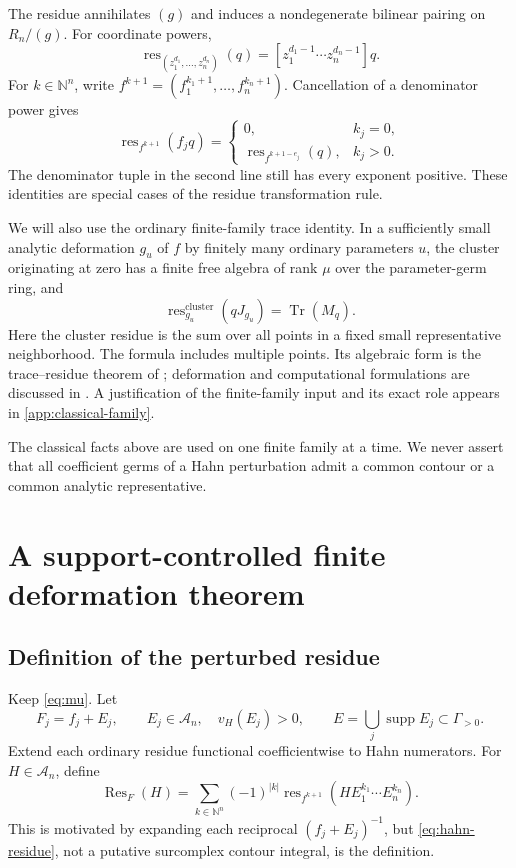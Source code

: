 \documentclass[11pt,letterpaper]{article}
\theoremstyle{definition}
\theoremstyle{remark}
\newcommand{\N}{\mathbb N}
\newcommand{\A}{\mathscr A}
\newcommand{\Res}{\operatorname{Res}}
\newcommand{\res}{\operatorname{res}}
\newcommand{\supp}{\operatorname{supp}}
\newcommand{\Tr}{\operatorname{Tr}}
\newcommand{\vH}{v_{\!H}}
\numberwithin{equation}{section}
\begin{document}
The residue annihilates $(g)$ and induces a nondegenerate bilinear pairing on $R_n/(g)$. For coordinate powers,
\begin{equation}\label{eq:coordinate-residue}
 \res_{(z_1^{d_1},\ldots,z_n^{d_n})}(q)
 =[z_1^{d_1-1}\cdots z_n^{d_n-1}]q.
\end{equation}
For $k\in\N^n$, write $f^{k+1}=(f_1^{k_1+1},\ldots,f_n^{k_n+1})$. Cancellation of a denominator power gives
\begin{equation}\label{eq:pole-cancel}
 \res_{f^{k+1}}(f_jq)=
 \begin{cases}
 0,& k_j=0,\\
 \res_{f^{k+1-e_j}}(q),& k_j>0.
 \end{cases}
\end{equation}
The denominator tuple in the second line still has every exponent positive. These identities are special cases of the residue transformation rule.

We will also use the ordinary finite-family trace identity. In a sufficiently small analytic deformation $g_u$ of $f$ by finitely many ordinary parameters $u$, the cluster originating at zero has a finite free algebra of rank $\mu$ over the parameter-germ ring, and
\begin{equation}\label{eq:ordinary-trace}
 \res_{g_u}^{\mathrm{cluster}}(qJ_{g_u})
 =\Tr(M_q).
\end{equation}
Here the cluster residue is the sum over all points in a fixed small representative neighborhood. The formula includes multiple points. Its algebraic form is the trace--residue theorem of \cite{SS}; deformation and computational formulations are discussed in \cite{KW,CDS}. A justification of the finite-family input and its exact role appears in \cref{app:classical-family}.

The classical facts above are used on one finite family at a time. We never assert that all coefficient germs of a Hahn perturbation admit a common contour or a common analytic representative.

\section{A support-controlled finite deformation theorem}\label{sec:deform}

\subsection{Definition of the perturbed residue}
Keep \eqref{eq:mu}. Let
\begin{equation}\label{eq:perturbed}
 F_j=f_j+E_j,\qquad E_j\in\A_n,\quad \vH(E_j)>0,
 \qquad E=\bigcup_j\supp E_j\subset\Gamma_{>0}.
\end{equation}
Extend each ordinary residue functional coefficientwise to Hahn numerators. For $H\in\A_n$, define
\begin{equation}\label{eq:hahn-residue}
 \boxed{\quad
 \Res_F(H)=\sum_{k\in\N^n}(-1)^{|k|}
 \res_{f^{k+1}}\!\left(H E_1^{k_1}\cdots E_n^{k_n}\right).
 \quad}
\end{equation}
This is motivated by expanding each reciprocal $(f_j+E_j)^{-1}$, but \eqref{eq:hahn-residue}, not a putative surcomplex contour integral, is the definition.
\end{document}
